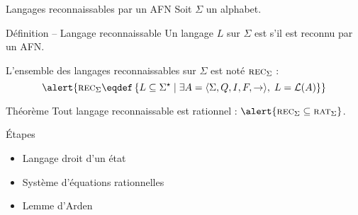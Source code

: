 
\begingroup

\begin{frame}{Langages reconnaissables par un AFN}
  Soit $\Sigma$ un alphabet.
  \begin{block}{Définition -- Langage reconnaissable}
    Un langage $L$ sur $\Sigma$ est  s'il est reconnu par un AFN. 

    L'ensemble des langages reconnaissables sur $\Sigma$ est noté \alert{$\textsc{rec}_\Sigma$} :
    $$\alert{\textsc{rec}_\Sigma \eqdef \left\{ L \subseteq \Sigma^\star \;\middle|\; \exists A = \langle \Sigma, Q, I, F, \rightarrow \rangle,\; L = \mathcal{L}(A) \right\}}$$

  \end{block}
  
  \vspace{-3mm}
  \begin{alertblock}{Théorème}
    Tout langage reconnaissable est rationnel : $\alert{\textsc{rec}_\Sigma \subseteq \textsc{rat}_\Sigma}$.
  \end{alertblock}

  \begin{center}
  \end{center}
  
  \begin{block}{Étapes}
    \begin{itemize}
    \item Langage droit d'un état
    \item Système d'équations rationnelles
    \item Lemme d'Arden
    \end{itemize}
  \end{block}
\end{frame}

\endgroup
